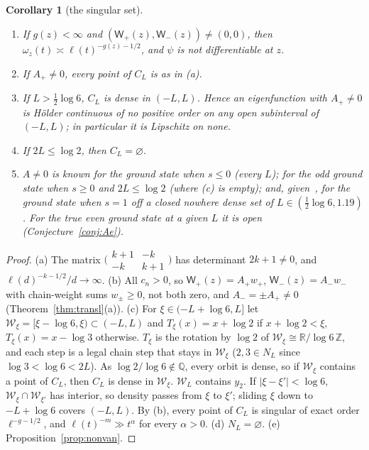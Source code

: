 \documentclass[11pt]{amsart}
\newcommand{\R}{\mathbb{R}}
\newtheorem{corollary}[theorem]{Corollary}
\theoremstyle{definition}
\theoremstyle{remark}
\numberwithin{equation}{section}
\begin{document}
\begin{corollary}[the singular set]\label{cor:K4}
\begin{enumerate}
\item[(a)] If $g(z)<\infty$ and $(\mathsf W_+(z),\mathsf W_-(z))\ne(0,0)$, then $\omega_z(t)\asymp\ell(t)^{-g(z)-1/2}$, and $\psi$ is not differentiable at $z$.
\item[(b)] If $A_+\ne0$, every point of $C_L$ is as in (a).
\item[(c)] If $L>\frac12\log6$, $C_L$ is dense in $(-L,L)$. Hence an eigenfunction with $A_+\ne0$ is H\"older continuous of no positive order on any open subinterval of $(-L,L)$; in particular it is Lipschitz on none.
\item[(d)] If $2L\le\log2$, then $C_L=\varnothing$.
\item[(e)] $A\ne0$ is known for the ground state when $s\le0$ (every $L$); for the odd ground state when $s\ge0$ and $2L\le\log2$ (where (c) is empty); and, given~\cite{GS}, for the ground state when $s=1$ off a closed nowhere dense set of $L\in(\frac12\log6,1.19)$. For the true even ground state at a given $L$ it is open (Conjecture~\ref{conj:Ae}).
\end{enumerate}
\end{corollary}

\begin{proof}
(a) The matrix $\bigl(\begin{smallmatrix}k+1&-k\\-k&k+1\end{smallmatrix}\bigr)$ has determinant $2k+1\ne0$, and $\ell(d)^{-k-1/2}/d\to\infty$. (b) All $c_n>0$, so $\mathsf W_+(z)=A_+w_+$, $\mathsf W_-(z)=A_-w_-$ with chain-weight sums $w_\pm\ge0$, not both zero, and $A_-=\pm A_+\ne0$ (Theorem~\ref{thm:transl}(a)). (c) For $\xi\in(-L+\log6,L]$ let $\mathcal W_\xi=[\xi-\log6,\xi)\subset(-L,L)$ and $T_\xi(x)=x+\log2$ if $x+\log2<\xi$, $T_\xi(x)=x-\log3$ otherwise. $T_\xi$ is the rotation by $\log2$ of $\mathcal W_\xi\cong\R/\log6\,\mathbb Z$, and each step is a legal chain step that stays in $\mathcal W_\xi$ ($2,3\in N_L$ since $\log3<\log6<2L$). As $\log2/\log6\notin\mathbb Q$, every orbit is dense, so if $\mathcal W_\xi$ contains a point of $C_L$, then $C_L$ is dense in $\mathcal W_\xi$. $\mathcal W_L$ contains $y_2$. If $|\xi-\xi'|<\log6$, $\mathcal W_\xi\cap\mathcal W_{\xi'}$ has interior, so density passes from $\xi$ to $\xi'$; sliding $\xi$ down to $-L+\log6$ covers $(-L,L)$. By (b), every point of $C_L$ is singular of exact order $\ell^{-g-1/2}$, and $\ell(t)^{-m}\gg t^\alpha$ for every $\alpha>0$. (d) $N_L=\varnothing$. (e) Proposition~\ref{prop:nonvan}.
\end{proof}
\end{document}
